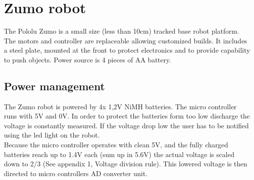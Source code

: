 \documentclass[11pt,a4paper,oneside,article]{memoir}
\begin{document}
\section{Zumo robot}
The Pololu Zumo is a small size (less than 10cm) tracked base robot platform. The motors and controller are replaceable allowing customized builds. It includes a steel plate, mounted at the front to protect electronics and to provide capability to push objects. Power source is 4 pieces of AA battery.\cite{zumo}

\subsection{Power management}
The Zumo robot is powered by 4x 1,2V NiMH batteries. The micro controller runs with 5V and 0V. In order to protect the batteries form too low discharge the voltage is constantly measured. If the voltage drop low the user has to be notified using the led light on the robot.\\
Because the micro controller operates with clean 5V, and the fully charged batteries reach up to 1.4V each (sum up in 5.6V) the actual voltage is scaled down to 2/3 (See appendix 1, Voltage division rule). This lowered voltage is then directed to micro controllers AD converter unit.\cite{Lectures}
\end{document}
